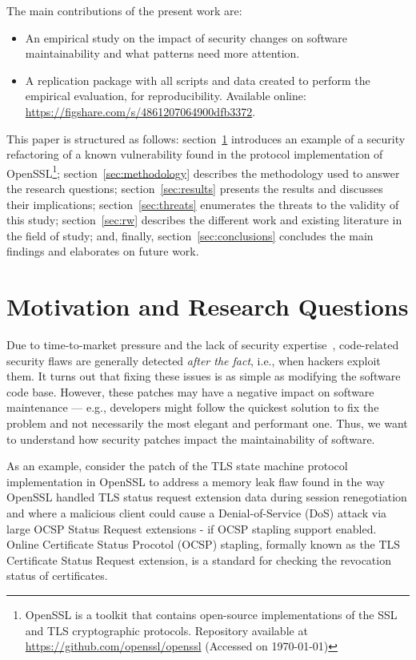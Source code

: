 \documentclass[10pt,conference]{IEEEtran}
\makeatletter
\newcommand\footnoteref[1]{\protected@xdef\@thefnmark{\ref{#1}}\@footnotemark}
\makeatother
\begin{document}
The main contributions of the present work are:
%
\begin{itemize}
	\item An empirical study on the impact of security changes on software
	maintainability and what patterns need more attention.
	\item A replication package with all scripts and data created to perform the
	empirical evaluation, for reproducibility. Available online:
  \url{https://figshare.com/s/4861207064900dfb3372}.
\end{itemize}
This paper is structured as follows: section~\ref{sec:motivation} introduces an
example of a security refactoring of a known vulnerability found in the
protocol implementation of OpenSSL\footnote{\label{openssl}OpenSSL is a toolkit that
contains open-source implementations of the SSL and TLS cryptographic
protocols. Repository available at \url{https://github.com/openssl/openssl}
(Accessed on \today{})}; section~\ref{sec:methodology} describes the
methodology used to answer the research questions; section~\ref{sec:results}
presents the results and discusses their
implications; section~\ref{sec:threats} enumerates the threats to the validity of
this study; section~\ref{sec:rw} describes the different work and existing
literature in the field of study; and, finally, section~\ref{sec:conclusions}
concludes the main findings and elaborates on future work.
%

\section{Motivation and Research Questions}\label{sec:motivation}
%
Due to time-to-market pressure and the lack of security expertise~\cite{8077802}, code-related
security flaws are generally detected \textit{after the fact}, i.e., when
hackers exploit them. It turns out that fixing these issues is as simple as
modifying the software code base. However, these patches may have a
negative impact on software maintenance --- e.g., developers might follow the
quickest solution to fix the problem and not necessarily the most elegant and
performant one. Thus, we want to understand how security patches impact
the maintainability of software. 

As an example, consider the patch of the TLS state machine protocol implementation
in OpenSSL\footnoteref{openssl} to address a memory leak flaw found in the way 
OpenSSL handled TLS status request extension data during session 
renegotiation and where a malicious client could cause a Denial-of-Service
(DoS) attack via large OCSP Status Request extensions - if OCSP stapling support
enabled. Online Certificate Status Procotol (OCSP) stapling, formally known as the TLS Certificate 
Status Request extension, is a standard for checking the revocation status of
certificates. 
\end{document}
